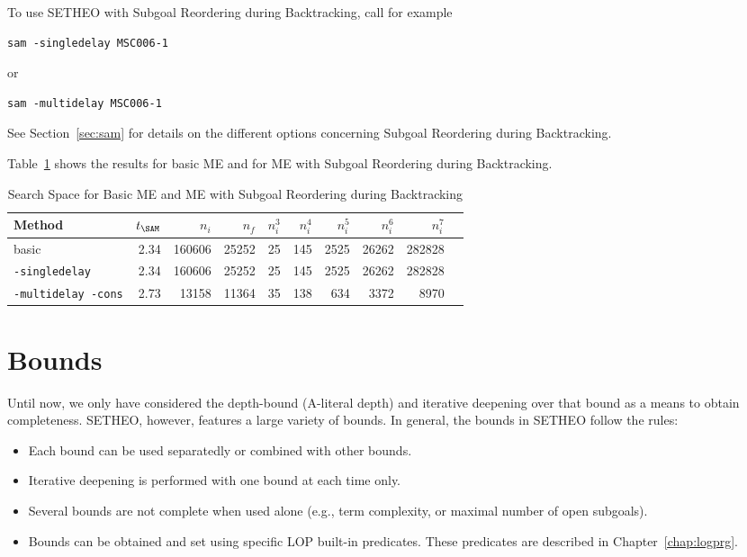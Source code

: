 To use SETHEO with Subgoal Reordering during Backtracking, call for
example 
\begin{center}
\begin{verbatim}
sam -singledelay MSC006-1
\end{verbatim}
\end{center}
or 
\begin{center}
\begin{verbatim}
sam -multidelay MSC006-1
\end{verbatim}
\end{center}
See Section~\ref{sec:sam} for details on the different options
concerning Subgoal Reordering during Backtracking.

Table~\ref{tab:tut2:results.delay} shows the results for basic
ME and for ME with Subgoal Reordering during Backtracking.

\begin{table}[htb]
\begin{center}
\begin{tabular}{|l|r|r|r||r|r|r|r|r|r|}
\hline
Method & $t_{\SAM}$ & $n_i$ & $n_f$ & 
	$n_i^3$ & $n_i^4$ & $n_i^5$ & $n_i^6$ & $n_i^7$ \\
\hline\hline
basic & 2.34 & 160606 & 25252 &
	25 & 145 & 2525 & 26262 & 282828 \\
\hline
{\tt -singledelay} & 2.34 & 160606 & 25252 &
	25 & 145 & 2525 & 26262 & 282828 \\
\hline
{\tt -multidelay -cons} & 2.73 & 13158 & 11364 &
	35 & 138 & 634 & 3372 & 8970 \\
\hline\hline
\end{tabular}
\end{center}
\caption{Search Space for Basic ME and ME with Subgoal Reordering
	during Backtracking}  
\label{tab:tut2:results.delay}
\end{table}


\section{Bounds}
\label{sec:tut2:bounds}

Until now, we only have considered the depth-bound (A-literal depth)
and iterative deepening over that bound as a means to obtain completeness.
SETHEO, however, features a large variety of bounds.
In general, the bounds in SETHEO follow the rules:
\begin{itemize}
\item
Each bound can be used separatedly or combined with other bounds.
\item
Iterative deepening is performed with one bound at each time only.
\item
Several bounds are not complete when used alone (e.g., term complexity,
or maximal number of open subgoals).
\item
Bounds can be obtained and set using specific LOP built-in predicates.
These predicates are described in Chapter~\ref{chap:logprg}.
\end{itemize}

